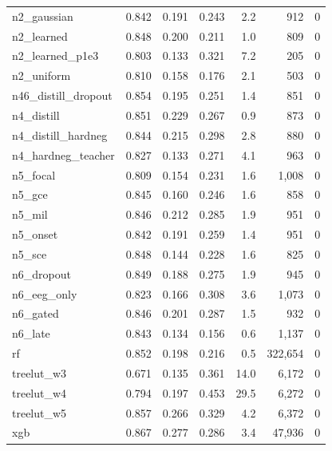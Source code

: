 \begin{table}[t]
{\begin{tabular}{lrrrrrr}
n2\_gaussian & 0.842 & 0.191 & 0.243 & 2.2 & 912 & 0 \\
n2\_learned & 0.848 & 0.200 & 0.211 & 1.0 & 809 & 0 \\
n2\_learned\_p1e3 & 0.803 & 0.133 & 0.321 & 7.2 & 205 & 0 \\
n2\_uniform & 0.810 & 0.158 & 0.176 & 2.1 & 503 & 0 \\
n46\_distill\_dropout & 0.854 & 0.195 & 0.251 & 1.4 & 851 & 0 \\
n4\_distill & 0.851 & 0.229 & 0.267 & 0.9 & 873 & 0 \\
n4\_distill\_hardneg & 0.844 & 0.215 & 0.298 & 2.8 & 880 & 0 \\
n4\_hardneg\_teacher & 0.827 & 0.133 & 0.271 & 4.1 & 963 & 0 \\
n5\_focal & 0.809 & 0.154 & 0.231 & 1.6 & 1,008 & 0 \\
n5\_gce & 0.845 & 0.160 & 0.246 & 1.6 & 858 & 0 \\
n5\_mil & 0.846 & 0.212 & 0.285 & 1.9 & 951 & 0 \\
n5\_onset & 0.842 & 0.191 & 0.259 & 1.4 & 951 & 0 \\
n5\_sce & 0.848 & 0.144 & 0.228 & 1.6 & 825 & 0 \\
n6\_dropout & 0.849 & 0.188 & 0.275 & 1.9 & 945 & 0 \\
n6\_eeg\_only & 0.823 & 0.166 & 0.308 & 3.6 & 1,073 & 0 \\
n6\_gated & 0.846 & 0.201 & 0.287 & 1.5 & 932 & 0 \\
n6\_late & 0.843 & 0.134 & 0.156 & 0.6 & 1,137 & 0 \\
rf & 0.852 & 0.198 & 0.216 & 0.5 & 322,654 & 0 \\
treelut\_w3 & 0.671 & 0.135 & 0.361 & 14.0 & 6,172 & 0 \\
treelut\_w4 & 0.794 & 0.197 & 0.453 & 29.5 & 6,272 & 0 \\
treelut\_w5 & 0.857 & 0.266 & 0.329 & 4.2 & 6,372 & 0 \\
xgb & 0.867 & 0.277 & 0.286 & 3.4 & 47,936 & 0 \\
\bottomrule\end{tabular}}\end{table}
